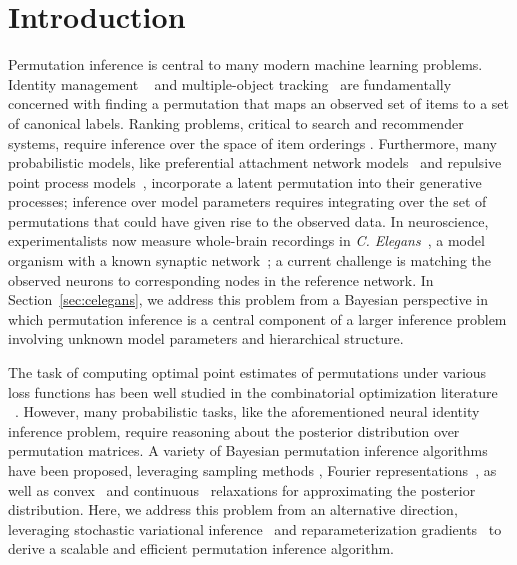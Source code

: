 \documentclass[twoside]{article}
\begin{document}
\section{Introduction}

Permutation inference is central to many modern machine learning
problems.  Identity management ~\citep{guibas2008identity} and
multiple-object tracking~\citep{shin2005lazy, kondor2007multi} are
fundamentally concerned with finding a permutation that maps an
observed set of items to a set of canonical labels.  Ranking problems,
critical to search and recommender systems, require inference over the
space of item orderings \citep{meilua2007consensus, lebanon2008non,
  adams2011ranking}.  Furthermore, many probabilistic models, like
preferential attachment network models~\citep{bloem2016random} and
repulsive point process models~\citep{rao2016bayesian}, incorporate a
latent permutation into their generative processes; inference over
model parameters requires integrating over the set of permutations
that could have given rise to the observed data.  In neuroscience,
experimentalists now measure whole-brain recordings in
\textit{C. Elegans}~\citep{Kato2015, nguyen2016whole}, a model
organism with a known synaptic network~\citep{white1986structure}; a
current challenge is matching the observed neurons to corresponding
nodes in the reference network.  In Section~\ref{sec:celegans}, we
address this problem from a Bayesian perspective in which permutation
inference is a central component of a larger inference problem involving
unknown model parameters and hierarchical structure.

The task of computing optimal point estimates of permutations under
various loss functions has been well studied in the combinatorial
optimization literature ~\citep{kuhn1955hungarian,
  munkres1957algorithms, lawler1963quadratic}. However, many
probabilistic tasks, like the aforementioned neural identity inference
problem, require reasoning about the posterior distribution over
permutation matrices.  A variety of Bayesian permutation inference
algorithms have been proposed, leveraging sampling methods
\citep{diaconis1988group, miller2013exact, harrison2013importance},
Fourier representations~\citep{kondor2007multi, huang2009fourier}, as
well as convex~\citep{lim2014beyond} and
continuous~\citep{plis2011directional} relaxations for approximating
the posterior distribution.  Here, we address this problem from an
alternative direction, leveraging stochastic variational
inference~\citep{hoffman2013stochastic} and reparameterization
gradients~\citep{rezende2014stochastic, Kingma2014} to derive a
scalable and efficient permutation inference algorithm.
\end{document}

